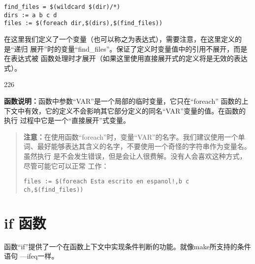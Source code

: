 \begin{Verbatim}[]
find_files = $(wildcard $(dir)/*)
dirs := a b c d
files := $(foreach dir,$(dirs),$(find_files))
\end{Verbatim}

在这里我们定义了一个变量（也可以称之为表达式），需要注意，在这里定义的是“递归
展开”时的变量“find\_files”。保证了定义时变量值中的引用不展开，而是在表达式被
函数处理时才展开（如果这里使用直接展开式的定义将是无效的表达式）。

\begin{dinglist}{226}
\itemsep=4pt \parskip=0pt

\item \textbf{函数说明：}函数中参数“VAR”是一个局部的临时变量，它只在“foreach”
    函数的上
    下文中有效，它的定义不会影响其它部分定义的同名“VAR”变量的值。在函数的执行
    过程中它是一个“直接展开”式变量。

\end{dinglist}


\begin{quote}\kaishu
\textbf{注意：}在使用函数“foreach”时，变量“VAR”的名字。我们建议使用一个单
词、最好能够表达其含义的名字，不要使用一个奇怪的字符串作为变量名。虽然执行
是不会发生错误，但是会让人很费解。没有人会喜欢这种方式，尽管可能它可以正常
工作：

\verb"files := $(foreach Esta escrito en espanol!,b c ch,$(find_files))"
\end{quote}

\section{if 函数}
函数“if”提供了一个在函数上下文中实现条件判断的功能。就像make所支持的条件语句
—ifeq一样。

